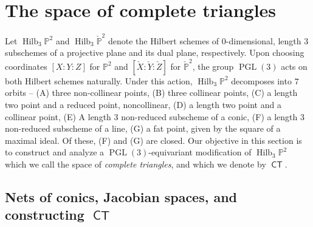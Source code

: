 \documentclass[reqno, 11pt]{amsart}
\theoremstyle{plain}
\theoremstyle{remark}
\renewcommand{\P}{\mathbb{P}}
\DeclareMathOperator{\PGL}{PGL}
\DeclareMathOperator{\Hilb}{Hilb}
\DeclareMathOperator{\CT}{\mathsf{CT}}
\begin{document}
\section{The space of complete triangles}
\label{sec:completetriangles}

Let $\Hilb_{3}\P^{2}$ and $\Hilb_{3}\check{\P}^{2}$ denote the Hilbert
schemes of $0$-dimensional, length $3$ subschemes of a projective
plane and its dual plane, respectively.  Upon choosing coordinates $[X:Y:Z]$ for $\P^{2}$ and $[\check{X}:\check{Y}:\check{Z}]$ for $\check{\P}^{2}$, the group
$\PGL(3)$ acts on both Hilbert schemes naturally.
Under this action, $\Hilb_{3}\P^{2}$ decomposes into $7$ orbits -- (A) three non-collinear points, (B) three collinear points, (C) a length two point and a reduced point, noncollinear, (D) a length two point and a collinear point, (E) A length 3 non-reduced subscheme of a conic, (F) a length 3 non-reduced subscheme of a line, (G) a fat point, given by the square of a maximal ideal.  Of these, (F) and (G) are closed.   Our objective in this section is to construct and analyze a $\PGL(3)$-equivariant modification of $\Hilb_{3}\P^{2}$ which we call the space of {\sl complete triangles}, and which we denote by $\CT$.

\subsection{Nets of conics, Jacobian spaces, and constructing $\CT$}
\end{document}
